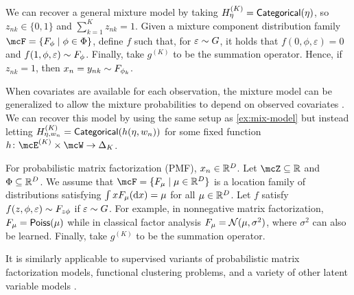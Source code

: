 \begin{example}\label{ex:mix-model}
	We can recover a general mixture model by taking $H_\eta^{(K)} = {\sf{Categorical}}(\eta)$, 
	so $z_{nk} \in \{0,1\}$ and $\sum_{k=1}^K z_{nk} = 1$.
	Given a mixture component distribution family $\mcF = \{ F_{\phi} \mid \phi \in \Phi \}$,
	define $f$ such that, for  $\varepsilon \sim G$, it holds that
    $f(0, \phi, \varepsilon) = 0$ and $f(1, \phi, \varepsilon) \sim F_\phi$. 
	Finally, take $g^{(K)}$ to be the summation operator.
	Hence, if $z_{nk} = 1$, then $x_n = y_{nk} \sim F_{\phi_k}$.
\end{example}
\begin{example} \label{ex:mix-model-varying}
	When covariates are available for each observation, the mixture model can be generalized to
	allow the mixture probabilities to depend on observed covariates \citep{Jaspers_BayesianEstimationMixtureCovariate_2018,Huang_MixtureRegressionModels_2012}.
	We can recover this model by using the same setup as \cref{ex:mix-model}
	but instead letting $H_{\eta,w_n}^{(K)} = {\sf{Categorical}}(h(\eta, w_{n}))$ for some fixed function
	$h \colon \mcE^{(K)} \times \mcW \to \Delta_{\numcomps}$.
\end{example}
\begin{example}\label{ex:pmf-formulations}
	For probabilistic matrix factorization (PMF), $x_n \in \mathbb{R}^{D}$.
	Let $\mcZ \subseteq \reals$ and $\Phi \subseteq \mathbb{R}^{D}$.
	We assume that $\mcF = \{ F_{\mu} \mid \mu \in \reals^{D} \}$ is a location family of distributions satisfying $\int x F_\mu(\mathrm{d} x) = \mu$ for all $\mu \in \mathbb{R}^{D}$.
	Let $f$ satisfy $f(z, \phi, \varepsilon) \sim F_{z \phi}$ if  $\varepsilon \sim G$.
	For example, in nonnegative matrix factorization, $F_{\mu} = {\sf{Poiss}}(\mu)$ while in classical factor analysis $F_{\mu} = \mathcal{N}(\mu, \sigma^{2})$,
	where $\sigma^{2}$ can also be learned.
	Finally, take $g^{(K)}$ to be the summation operator.
\end{example}
It is similarly applicable to supervised variants of probabilistic matrix factorization models, functional clustering problems, and a variety
of other latent variable models \citep{Carvalho:2008,Chiou:2007,Cunningham:2014,West:2003,Blei:2007,Dunson:2000}.


